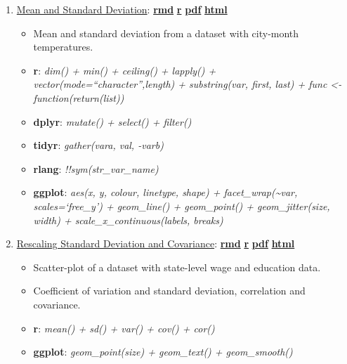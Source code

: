 \documentclass[
]{book}
\providecommand{\tightlist}{%
  \setlength{\itemsep}{0pt}\setlength{\parskip}{0pt}}
\begin{document}
\begin{enumerate}
\def\labelenumi{\arabic{enumi}.}
\tightlist
\item
  \href{https://fanwangecon.github.io/Stat4Econ/summarystats/htmlpdfr/meansdhist.html}{Mean and Standard Deviation}: \href{https://github.com/FanWangEcon/Stat4Econ/blob/master/summarystats//meansdhist.Rmd}{\textbf{rmd}} \textbar{} \href{https://github.com/FanWangEcon/Stat4Econ/blob/master/summarystats/htmlpdfr/meansdhist.R}{\textbf{r}} \textbar{} \href{https://github.com/FanWangEcon/Stat4Econ/blob/master/summarystats/htmlpdfr/meansdhist.pdf}{\textbf{pdf}} \textbar{} \href{https://fanwangecon.github.io/Stat4Econ/summarystats/htmlpdfr/meansdhist.html}{\textbf{html}}

  \begin{itemize}
  \tightlist
  \item
    Mean and standard deviation from a dataset with city-month temperatures.
  \item
    \textbf{r}: \emph{dim() + min() + ceiling() + lapply() + vector(mode=``character'',length) + substring(var, first, last) + func \textless- function(return(list))}
  \item
    \textbf{dplyr}: \emph{mutate() + select() + filter()}
  \item
    \textbf{tidyr}: \emph{gather(vara, val, -varb)}
  \item
    \textbf{rlang}: \emph{!!sym(str\_var\_name)}
  \item
    \textbf{ggplot}: \emph{aes(x, y, colour, linetype, shape) + facet\_wrap(\textasciitilde var, scales=`free\_y') + geom\_line() + geom\_point() + geom\_jitter(size, width) + scale\_x\_continuous(labels, breaks)}
  \end{itemize}
\item
  \href{https://fanwangecon.github.io/Stat4Econ/summarystats/htmlpdfr/toolboxone.html}{Rescaling Standard Deviation and Covariance}: \href{https://github.com/FanWangEcon/Stat4Econ/blob/master/summarystats//toolboxone.Rmd}{\textbf{rmd}} \textbar{} \href{https://github.com/FanWangEcon/Stat4Econ/blob/master/summarystats/htmlpdfr/toolboxone.R}{\textbf{r}} \textbar{} \href{https://github.com/FanWangEcon/Stat4Econ/blob/master/summarystats/htmlpdfr/toolboxone.pdf}{\textbf{pdf}} \textbar{} \href{https://fanwangecon.github.io/Stat4Econ/summarystats/htmlpdfr/toolboxone.html}{\textbf{html}}

  \begin{itemize}
  \tightlist
  \item
    Scatter-plot of a dataset with state-level wage and education data.
  \item
    Coefficient of variation and standard deviation, correlation and covariance.
  \item
    \textbf{r}: \emph{mean() + sd() + var() + cov() + cor()}
  \item
    \textbf{ggplot}: \emph{geom\_point(size) + geom\_text() + geom\_smooth()}
  \end{itemize}
\end{enumerate}
\end{document}
